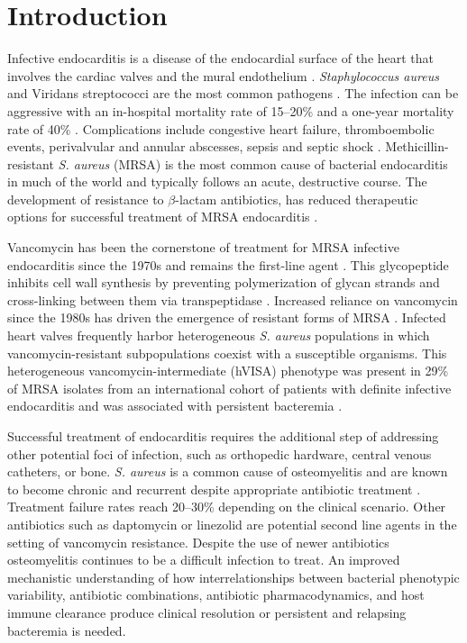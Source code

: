 \documentclass[utf8]{FrontiersinHarvard} %
\begin{document}
\section{Introduction}
Infective endocarditis is a disease of the endocardial surface of the heart that
involves the cardiac valves and the mural endothelium \citep{Li2024}. \textit{Staphylococcus aureus} and Viridans streptococci
are the most common pathogens \citep{HammondHaley2023}. The infection can be aggressive
with an in-hospital mortality rate of 15--20\% and a one-year mortality rate of
40\% \citep{Taduru2023}. Complications include congestive heart failure,
thromboembolic events, perivalvular and annular abscesses, sepsis and septic shock \citep{murdoch2009infective}. Methicillin-resistant
\textit{S. aureus} (MRSA) is the most common cause of bacterial endocarditis in
much of the world and typically follows an acute, destructive course. The development of resistance to $\beta$-lactam antibiotics, has reduced therapeutic options for successful treatment of MRSA endocarditis \citep{HammondHaley2023}.

Vancomycin has been the cornerstone of treatment for MRSA infective endocarditis
since the 1970s and remains the first-line agent \citep{Minter2023}. This
glycopeptide inhibits cell wall synthesis by preventing polymerization of glycan
strands and cross-linking between them via transpeptidase
\citep{murray_glycopeptides_2019}. Increased reliance on vancomycin since the
1980s has driven the emergence of resistant forms of MRSA
\citep{mcguinness2017vancomycin}.  Infected heart valves frequently harbor heterogeneous \textit{S. aureus}
populations in which vancomycin-resistant subpopulations coexist with a
susceptible organisms. This heterogeneous vancomycin-intermediate (hVISA)
phenotype was present in 29\% of MRSA isolates from an international cohort of
patients with definite infective endocarditis and was associated with persistent
bacteremia \citep{Bae2009}.

Successful treatment of endocarditis requires the additional step of addressing
other potential foci of infection, such as orthopedic hardware, central venous
catheters, or bone.  \textit{S. aureus} is a common cause of osteomyelitis and are known to become chronic and recurrent despite appropriate antibiotic treatment \citep{Kahl2016SCV}. Treatment
failure rates reach 20--30\% depending on the clinical scenario. Other antibiotics such as daptomycin or linezolid are potential second line agents in the setting of vancomycin resistance.  Despite the use of newer antibiotics osteomyelitis continues to be a difficult infection to treat. An improved mechanistic understanding of how interrelationships between bacterial phenotypic variability, antibiotic combinations, antibiotic pharmacodynamics, and host immune clearance produce clinical
resolution or persistent and relapsing bacteremia is needed.
\end{document}
